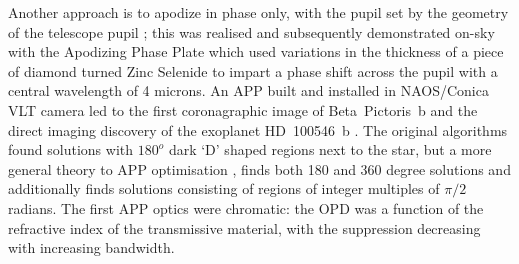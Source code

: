 \documentclass[letterpaper]{ar-1col}
\begin{document}
Another approach is to apodize in phase only, with the pupil set by the geometry of the telescope pupil \citep{Codona04}; this was realised and subsequently demonstrated on-sky with the Apodizing Phase Plate \citep[APP; ][]{Kenworthy07} which used variations in the thickness of a piece of diamond turned Zinc Selenide to impart a phase shift across the pupil with a central wavelength of 4 microns.
%
An APP built and installed in NAOS/Conica VLT camera \citep{Kenworthy10} led to the first coronagraphic image of Beta~Pictoris~b \citep{Quanz10} and the direct imaging discovery of the exoplanet HD~100546~b \citep{Quanz13}.
%
The original algorithms found solutions with $180^o$ dark `D' shaped regions next to the star, but a more general theory to APP optimisation \citep{Por17}, finds both 180 and 360 degree solutions and additionally finds solutions consisting of regions of integer multiples of $\pi/2$ radians.
%
The first APP optics were chromatic: the OPD was a function of the refractive index of the transmissive material, with the suppression decreasing with increasing bandwidth.
\end{document}
